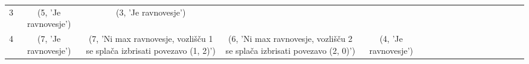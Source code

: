 \documentclass[fin1, tisk]{fmfdelo}
\begin{document}
\begin{table}[h]
{\begin{tabular}{|c|*{16}{c|}}
            3 & (5, 'Je ravnovesje')  & (3, 'Je ravnovesje')                                                      &                                                                           &                                                                           &                                                                           &                                                                           &                                                                           &                                                                           &                                                                           &                                                                           &                                                                           &                                                                           &                                                                           &                                                                           &                                                                          &                      \\
            4 & (7, 'Je ravnovesje')  & (7, 'Ni max ravnovesje, vozlišču 1 se splača izbrisati povezavo (1, 2)')  & (6, 'Ni max ravnovesje, vozlišču 2 se splača izbrisati povezavo (2, 0)')  & (4, 'Je ravnovesje')                                                      &                                                                           &                                                                           &                                                                           &                                                                           &                                                                           &                                                                           &                                                                           &                                                                           &                                                                           &                                                                           &                                                                          &                      \\

\end{tabular}}
\end{table}
\end{document}
